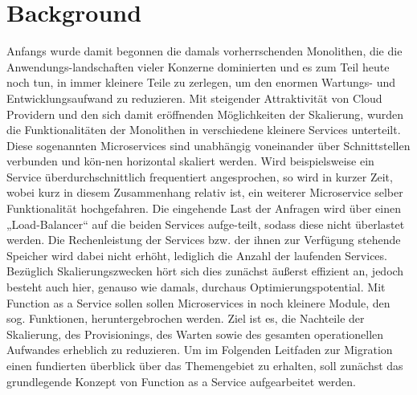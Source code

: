 \documentclass[a4paper,twoside,11pt, pagesize]{scrartcl}
\begin{document}
\section{Background}
Anfangs wurde damit begonnen die damals vorherrschenden Monolithen, die die Anwendungs-landschaften vieler Konzerne dominierten und es zum Teil heute noch tun, in immer kleinere Teile zu zerlegen, um den enormen Wartungs- und Entwicklungsaufwand zu reduzieren. Mit steigender Attraktivität von Cloud Providern und den sich damit eröffnenden Möglichkeiten der Skalierung, wurden die Funktionalitäten der Monolithen in verschiedene kleinere Services unterteilt. Diese sogenannten Microservices sind unabhängig voneinander über Schnittstellen verbunden und kön-nen horizontal skaliert werden. Wird beispielsweise ein Service überdurchschnittlich frequentiert angesprochen, so wird in kurzer Zeit, wobei kurz in diesem Zusammenhang relativ ist, ein weiterer Microservice selber Funktionalität hochgefahren. Die eingehende Last der Anfragen wird über einen „Load-Balancer“ auf die beiden Services aufge-teilt, sodass diese nicht überlastet werden. Die Rechenleistung der Services bzw. der ihnen zur Verfügung stehende Speicher wird dabei nicht erhöht, lediglich die Anzahl der laufenden Services. Bezüglich Skalierungszwecken hört sich dies zunächst äußerst effizient an, jedoch besteht auch hier, genauso wie damals, durchaus Optimierungspotential. Mit Function as a Service sollen sollen Microservices in noch kleinere Module, den sog. Funktionen, heruntergebrochen werden. Ziel ist es, die Nachteile der Skalierung, des Provisionings, des Warten sowie des gesamten operationellen Aufwandes erheblich zu reduzieren. Um im Folgenden Leitfaden zur Migration einen fundierten überblick über das Themengebiet zu erhalten, soll zunächst das grundlegende Konzept von Function as a Service aufgearbeitet werden.
\end{document}
